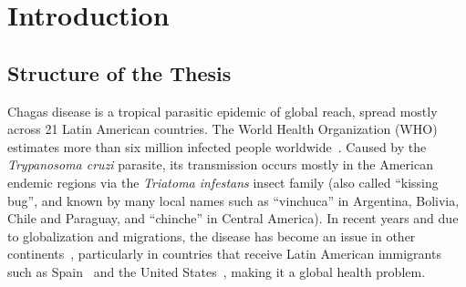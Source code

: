 
\chapter{Introduction}\label{ch:introduction}

\section{Structure of the Thesis}


Chagas disease is a tropical parasitic epidemic of global reach, spread mostly across 21 Latin American countries. The World Health Organization (WHO) estimates more than six million infected people worldwide~\cite{who2016}. Caused by the \textit{Trypanosoma cruzi} parasite, its transmission occurs mostly in the American endemic regions via the \textit{Triatoma infestans} insect family (also called ``kissing bug'', and known by many local names such as ``vinchuca'' in Argentina, Bolivia, Chile and Paraguay, and ``chinche'' in Central America). In recent years and due to globalization and migrations, the disease has become an %
issue in other continents~\cite{schmunis2010chagas},
particularly in countries that receive Latin American immigrants such as Spain~\cite{navarro2012chagas} and the United States~\cite{hotez2013unfolding},
making it a global health problem.


